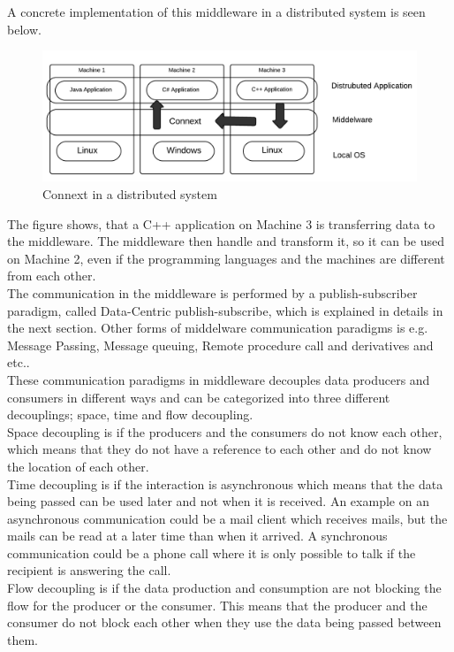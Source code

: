 \documentclass[Main]{subfiles}
\begin{document}
A concrete implementation of this middleware in a distributed system is seen below.
\begin{figure}[H]
\centering
\includegraphics[scale=0.4]{Figure/MiddelwareImplementation.png}
\caption{Connext in a distributed system}
\end{figure}

The figure shows, that a C++ application on Machine 3 is transferring data to the middleware. The middleware then handle and transform it, so it can be used on Machine 2, even if the programming languages and the machines are different from each other. 
\\
The communication in the middleware is performed by a publish-subscriber paradigm, called Data-Centric publish-subscribe, which is explained in details in the next section. Other forms of middelware communication paradigms is e.g. Message Passing, Message queuing, Remote procedure call and derivatives and etc.\cite{DDS-slides}.\\
These communication paradigms in middleware decouples data producers and consumers in different ways and can be categorized into three different decouplings; space, time and flow decoupling.\\
Space decoupling is if the producers and the consumers do not know each other, which means that they do not have a reference to each other and do not know the location of each other.
\\
Time decoupling is if the interaction is asynchronous which means that the data being passed can be used later and not when it is received. An example on an asynchronous communication could be a mail client which receives mails, but the mails can be read at a later time than when it arrived. A synchronous communication could be a phone call where it is only possible to talk if the recipient is answering the call. \\
Flow decoupling is if the data production and consumption are not blocking the flow for the producer or the consumer. This means that the producer and the consumer do not block each other when they use the data being passed between them.\\
\end{document}
